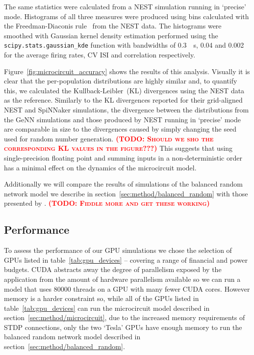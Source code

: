 \documentclass[utf8]{frontiersSCNS} %
\newcommand{\todo}[1]{\textbf{\textsc{\textcolor{red}{(TODO: #1)}}}}
\begin{document}
The same statistics were calculated from a NEST simulation running in `precise' mode.
Histograms of all three measures were produced using bins calculated with the Freedman-Diaconis rule~\citep{Freedman1981} from the NEST data.
The histograms were smoothed with Gaussian kernel density estimation performed using the \lstinline{scipy.stats.gaussian_kde} function with bandwidths of \SI{0.3}{\per\second}, \num{0.04} and \num{0.002} for the average firing rates, CV ISI and correlation respectively.

Figure~\ref{fig:microcircuit_accuracy} shows the results of this analysis.
Visually it is clear that the per-population distributions are highly similar and, to quantify this, we calculated the Kullback-Leibler~(KL) divergences using the NEST data as the reference.
Similarly to the KL divergences \citet{VanAlbada2018} reported for their grid-aligned NEST and SpiNNaker simulations, the divergence between the distributions from the GeNN simulations and those produced by NEST running in `precise' mode are comparable in size to the divergences caused by simply changing the seed used for random number generation. \todo{Should we sho the corresponding KL values in the figure???}
This suggests that using single-precision floating point and summing inputs in a non-deterministic order has a minimal effect on the dynamics of the microcircuit model.

Additionally we will compare the results of simulations of the balanced random network model we describe in section~\ref{sec:method/balanced_random} with those presented by \citet{Morrison2007}.
\todo{Fiddle more and get these working}

\subsection{Performance}
\label{sec:results/performance}
To assess the performance of our GPU simulations we chose the selection of GPUs listed in table~\ref{tab:gpu_devices} -- covering a range of financial and power budgets.
CUDA abstracts away the degree of parallelism exposed by the application from the amount of hardware parallelism available so we can run a model that uses \num{80000} threads on a GPU with many fewer CUDA cores.
However memory is a harder constraint so, while all of the GPUs listed in table~\ref{tab:gpu_devices} can run the microcircuit model described in section~\ref{sec:method/microcircuit}, due to the increased memory requirements of STDP connections, only the two `Tesla' GPUs have enough memory to run the balanced random network model described in section~\ref{sec:method/balanced_random}.
\end{document}
